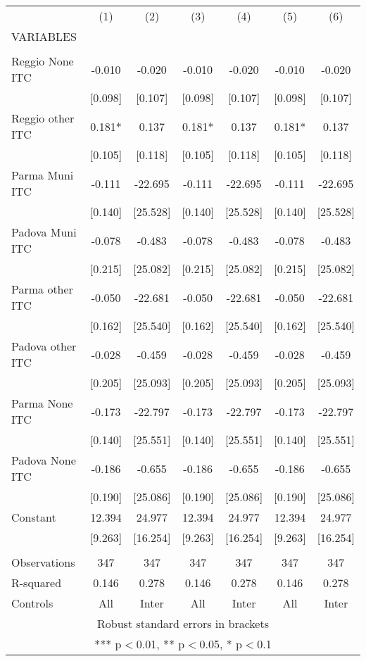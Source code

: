 \begin{tabular}{lcccccc} \hline
 & (1) & (2) & (3) & (4) & (5) & (6) \\
VARIABLES &  &  &  &  &  &  \\ \hline
 &  &  &  &  &  &  \\
Reggio None ITC & -0.010 & -0.020 & -0.010 & -0.020 & -0.010 & -0.020 \\
 & [0.098] & [0.107] & [0.098] & [0.107] & [0.098] & [0.107] \\
Reggio other ITC & 0.181* & 0.137 & 0.181* & 0.137 & 0.181* & 0.137 \\
 & [0.105] & [0.118] & [0.105] & [0.118] & [0.105] & [0.118] \\
Parma Muni ITC & -0.111 & -22.695 & -0.111 & -22.695 & -0.111 & -22.695 \\
 & [0.140] & [25.528] & [0.140] & [25.528] & [0.140] & [25.528] \\
Padova Muni ITC & -0.078 & -0.483 & -0.078 & -0.483 & -0.078 & -0.483 \\
 & [0.215] & [25.082] & [0.215] & [25.082] & [0.215] & [25.082] \\
Parma other ITC & -0.050 & -22.681 & -0.050 & -22.681 & -0.050 & -22.681 \\
 & [0.162] & [25.540] & [0.162] & [25.540] & [0.162] & [25.540] \\
Padova other ITC & -0.028 & -0.459 & -0.028 & -0.459 & -0.028 & -0.459 \\
 & [0.205] & [25.093] & [0.205] & [25.093] & [0.205] & [25.093] \\
Parma None ITC & -0.173 & -22.797 & -0.173 & -22.797 & -0.173 & -22.797 \\
 & [0.140] & [25.551] & [0.140] & [25.551] & [0.140] & [25.551] \\
Padova None ITC & -0.186 & -0.655 & -0.186 & -0.655 & -0.186 & -0.655 \\
 & [0.190] & [25.086] & [0.190] & [25.086] & [0.190] & [25.086] \\
Constant & 12.394 & 24.977 & 12.394 & 24.977 & 12.394 & 24.977 \\
 & [9.263] & [16.254] & [9.263] & [16.254] & [9.263] & [16.254] \\
 &  &  &  &  &  &  \\
Observations & 347 & 347 & 347 & 347 & 347 & 347 \\
R-squared & 0.146 & 0.278 & 0.146 & 0.278 & 0.146 & 0.278 \\
 Controls & All & Inter & All & Inter & All & Inter \\ \hline
\multicolumn{7}{c}{ Robust standard errors in brackets} \\
\multicolumn{7}{c}{ *** p$<$0.01, ** p$<$0.05, * p$<$0.1} \\
\end{tabular}
